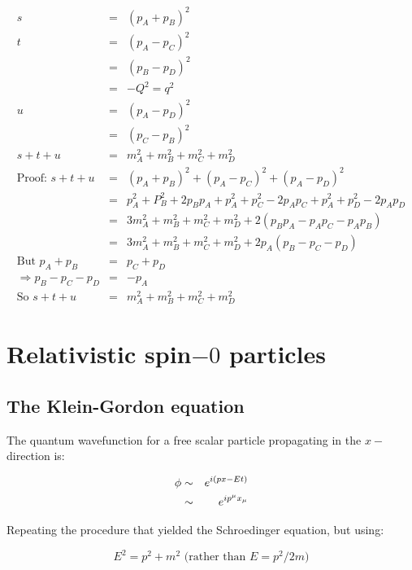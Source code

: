 \begin{eqnarray*}
  s & = & \left(p_A + p_B\right)^2 \\
  t & = & \left(p_A - p_C\right)^2 \\
    & = & \left(p_B - p_D\right)^2 \\
    & = & -Q^2 = q^2 \\
  u & = & \left(p_A - p_D\right)^2 \\
    & = & \left(p_C - p_B\right)^2 \\
    s + t + u & = & m^2_A + m^2_B + m^2_C + m^2_D \\
    \textrm{Proof: } s + t + u & = & \left(p_A + p_B\right)^2 + \left(p_A - p_C\right)^2 + \left(p_A - p_D\right)^2 \\
    & = & p^2_A + P^2_B + 2p_Bp_A + p^2_A + p^2_C - 2p_Ap_C + p^2_A + p^2_D - 2p_Ap_D \\
    & = & 3m^2_A + m^2_B + m^2_C + m^2_D + 2\left(p_Bp_A - p_Ap_C - p_Ap_B\right) \\
    & = & 3m^2_A + m^2_B + m^2_C + m^2_D + 2p_A\left(p_B - p_C - p_D\right) \\
    \textrm{But } p_A + p_B & = & p_C + p_D \\
    \Rightarrow p_B - p_C - p_D & = & -p_A \\
    \textrm{So } s + t + u & = & m^2_A + m^2_B + m^2_C + m^2_D
\end{eqnarray*}

\section{Relativistic spin\texorpdfstring{$-0$}{-0} particles}

\subsection{The Klein-Gordon equation}

The quantum wavefunction for a free scalar particle propagating in the $x-$direction is:

\begin{eqnarray*}
  \phi & \sim & e^{i(px - Et)} \\
       & \sim & e^{ip^{\mu}x_{\mu}}
\end{eqnarray*}

Repeating the procedure that yielded the Schroedinger equation, but using:

\begin{equation}
  E^2 = p^2 + m^2 \textrm{ (rather than }E = p^2/2m\textrm{)} \label{eq:relativisticmass}
\end{equation}

